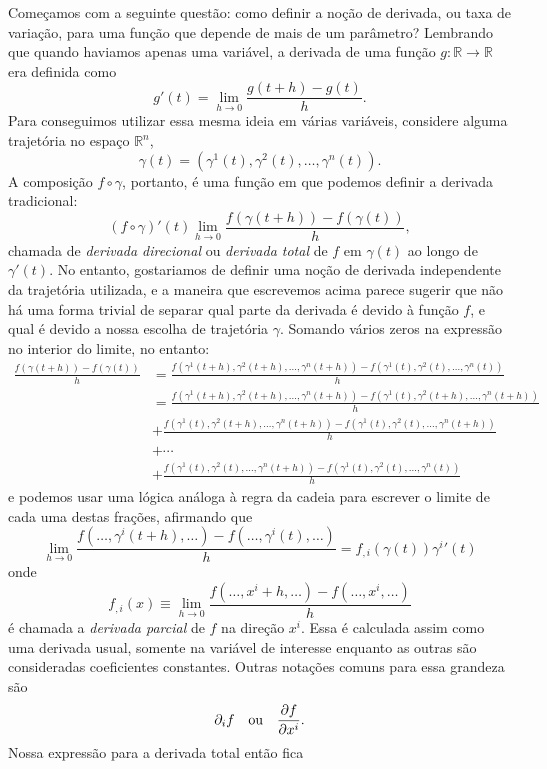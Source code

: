 \documentclass[a4paper, 12pt]{article}
\newcommand{\pd}[3]{
    \ifblank{#3}{}{\left(}
    \frac{\partial #1}{\partial #2}
    \ifblank{#3}{}{\right)_{#3}}
}
\theoremstyle{definition}
\theoremstyle{definition}
\begin{document}
Começamos com a seguinte questão: como definir a noção de derivada, ou taxa de variação, para uma função que
depende de mais de um parâmetro? Lembrando que quando haviamos apenas uma variável, a derivada de uma função
$g:\mathbb R\rightarrow\mathbb R$ era definida como
$$g'(t)=\lim\limits_{h\rightarrow0}\frac{g(t+h)-g(t)}{h}.$$
Para conseguimos utilizar essa mesma ideia em várias variáveis, considere alguma trajetória no espaço 
$\mathbb R^n$,
$$\gamma(t)=(\gamma^1(t),\gamma^2(t),\dots,\gamma^n(t)).$$
A composição $f\circ\gamma$, portanto, é uma função em que podemos definir a derivada tradicional:
$$(f\circ\gamma)'(t)\lim\limits_{h\rightarrow0}\frac{f(\gamma(t+h))-f(\gamma(t))}{h},$$
chamada de \textit{derivada direcional} ou \textit{derivada total} de $f$ em $\gamma(t)$ ao longo de $\gamma'(t)$. 
No entanto, gostariamos de definir uma noção de derivada independente da trajetória utilizada, e a maneira 
que escrevemos acima parece sugerir que não há uma forma trivial de separar qual parte da derivada é devido à função $f$,
e qual é devido a nossa escolha de trajetória $\gamma$. Somando vários zeros na expressão no interior do limite, 
no entanto:
\begin{align*}
    \frac{f(\gamma(t+h))-f(\gamma(t))}{h}
    &=\frac{f(\gamma^1(t+h),\gamma^2(t+h),\dots,\gamma^n(t+h))-f(\gamma^1(t),\gamma^2(t),\dots,\gamma^n(t))}{h}\\
    &=\frac{f(\gamma^1(t+h),\gamma^2(t+h),\dots,\gamma^n(t+h))-f(\gamma^1(t),\gamma^2(t+h),\dots,\gamma^n(t+h))}{h}\\
    &+\frac{f(\gamma^1(t),\gamma^2(t+h),\dots,\gamma^n(t+h))-f(\gamma^1(t),\gamma^2(t),\dots,\gamma^n(t+h))}{h}\\
    &+\cdots\\
    &+\frac{f(\gamma^1(t),\gamma^2(t),\dots,\gamma^n(t+h))-f(\gamma^1(t),\gamma^2(t),\dots,\gamma^n(t))}{h}
\end{align*}
e podemos usar uma lógica análoga à regra da cadeia para escrever o limite de cada uma destas frações,
afirmando que
$$\lim\limits_{h\rightarrow0}\frac{f(\dots,\gamma^i(t+h),\dots)
-f(\dots,\gamma^i(t),\dots)}{h}=f_{,i}(\gamma(t))\gamma^i{'}(t)$$
onde
$$f_{,i}(x)\equiv\lim\limits_{h\rightarrow0}\frac{f(\dots,x^i+h,\dots)-f(\dots,x^i,\dots)}{h}$$
é chamada a \textit{derivada parcial} de $f$ na direção $x^i$. Essa é calculada assim como uma derivada
usual, somente na variável de interesse enquanto as outras são consideradas coeficientes constantes.
Outras notações comuns para essa grandeza são
$$\partial_i f\quad\text{ou}\quad\pd{f}{x^i}{}.$$
Nossa expressão para a derivada total então fica
\end{document}
